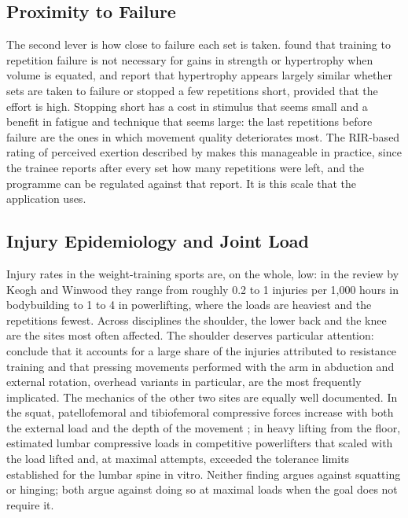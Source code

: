 \documentclass[11pt,a4paper]{article}
\begin{document}
\subsection*{Proximity to Failure}

The second lever is how close to failure each set is taken. \citet{grgic2022} found that training to repetition failure is not necessary for gains in strength or hypertrophy when volume is equated, and \citet{refalo2023} report that hypertrophy appears largely similar whether sets are taken to failure or stopped a few repetitions short, provided that the effort is high. Stopping short has a cost in stimulus that seems small and a benefit in fatigue and technique that seems large: the last repetitions before failure are the ones in which movement quality deteriorates most. The RIR-based rating of perceived exertion described by \citet{helms2016} makes this manageable in practice, since the trainee reports after every set how many repetitions were left, and the programme can be regulated against that report. It is this scale that the application uses.

\subsection*{Injury Epidemiology and Joint Load}

Injury rates in the weight-training sports are, on the whole, low: in the review by Keogh and Winwood \citeyearpar{keogh2017} they range from roughly 0.2 to 1 injuries per 1,000 hours in bodybuilding to 1 to 4 in powerlifting, where the loads are heaviest and the repetitions fewest. Across disciplines the shoulder, the lower back and the knee are the sites most often affected. The shoulder deserves particular attention: \citet{kolber2010} conclude that it accounts for a large share of the injuries attributed to resistance training and that pressing movements performed with the arm in abduction and external rotation, overhead variants in particular, are the most frequently implicated. The mechanics of the other two sites are equally well documented. In the squat, patellofemoral and tibiofemoral compressive forces increase with both the external load and the depth of the movement \citep{escamilla2001}; in heavy lifting from the floor, \citet{cholewicki1991} estimated lumbar compressive loads in competitive powerlifters that scaled with the load lifted and, at maximal attempts, exceeded the tolerance limits established for the lumbar spine in vitro. Neither finding argues against squatting or hinging; both argue against doing so at maximal loads when the goal does not require it.
\end{document}
